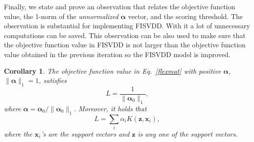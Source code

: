 \documentclass{article}
\newcommand{\eref}[1]{Eq.~\ref{#1}}
\newtheorem{corollary}[theorem]{Corollary}
\numberwithin{equation}{section}
\begin{document}
Finally, we state and prove an observation that relates the objective function value, the 1-norm of the \textit{unnormalized} $\boldsymbol{\alpha}$ vector, and the scoring threshold. The observation is substantial for implementing FISVDD. With it a lot of unnecessary computations can be saved. This observation can be also used to make sure that the objective function value in FISVDD is not larger than the objective function value obtained in the previous iteration so the FISVDD model is improved.
\begin{corollary}\label{alphanorm}
The objective function value in \eref{flexmat} with positive $\boldsymbol{\alpha}$, $\|\boldsymbol{\alpha}\|_1 = 1$, satisfies
\begin{equation}\label{alphanorm_eq1}
L = \frac{1}{\|\boldsymbol{\alpha}_0\|_1},
\end{equation}
where $\boldsymbol{\alpha}= \boldsymbol{\alpha}_0 / \|\boldsymbol{\alpha}_0\|_1$. Moreover, it holds that
\begin{equation}\label{alphanorm_eq2}
L = \sum_i\alpha_iK(\mathbf{z},\mathbf{x}_i),
\end{equation}
where the $\mathbf{x}_i$'s are the support vectors and $\mathbf{z}$ is any one of the support vectors.
\end{corollary}
\end{document}
